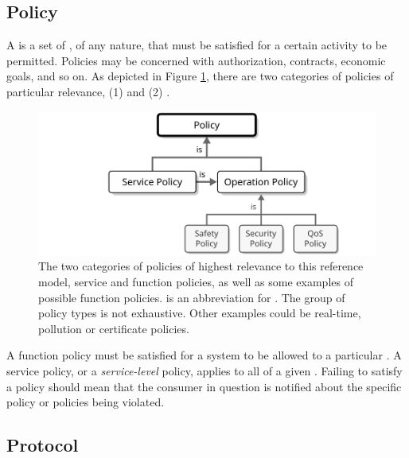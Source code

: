 \newpage

\subsection{Policy}
\label{sec:concepts:policy}

A  is a set of , of any nature, that must be satisfied for a certain activity to be permitted.
Policies may be concerned with authorization, contracts, economic goals, and so on.
As depicted in Figure \ref{fig:policy}, there are two categories of policies of particular relevance, (1)  and (2) .

\begin{figure}[ht!]
  \centering
  \includegraphics[scale=0.9]{figures/policy}
  \caption{
    The two categories of policies of highest relevance to this reference model, service and function policies, as well as some examples of possible function policies.
     is an abbreviation for .
    The group of policy types is not exhaustive.
    Other examples could be real-time, pollution or certificate policies.
  }
  \label{fig:policy}
\end{figure}

A function policy must be satisfied for a system to be allowed to  a particular .
A service policy, or a \textit{service-level} policy, applies to all  of a given .
Failing to satisfy a policy should mean that the consumer in question is notified about the specific policy or policies being violated.

\subsection{Protocol}
\label{sec:concepts:protocol}

